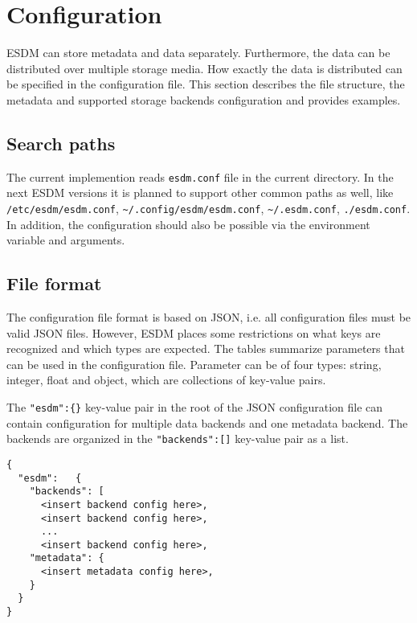 \section{Configuration}

ESDM can store metadata and data separately.
Furthermore, the data can be distributed over multiple storage media.
How exactly the data is distributed can be specified in the configuration file.
This section describes the file structure, the metadata and supported storage backends configuration and provides examples.

\subsection{Search paths}

The current implemention reads \lstinline|esdm.conf| file in the current directory.
In the next ESDM versions it is planned to support other common paths as well, like \lstinline|/etc/esdm/esdm.conf|, \lstinline|~/.config/esdm/esdm.conf|, \lstinline|~/.esdm.conf|, \lstinline|./esdm.conf|.
In addition, the configuration should also be possible via the environment variable and arguments.


\subsection{File format}
The configuration file format is based on JSON, i.e. all configuration files must be valid JSON files.
However, ESDM places some restrictions on what keys are recognized and which types are expected.
The tables summarize parameters that can be used in the configuration file.
Parameter can be of four types: string, integer, float and object, which are collections of key-value pairs.

The \lstinline|"esdm":{}| key-value pair in the root of the JSON configuration file can contain configuration for multiple data backends and one metadata backend.
The backends are organized in the \lstinline|"backends":[]| key-value pair as a list.



\begin{lstlisting}
{
  "esdm":	{
    "backends": [
      <insert backend config here>,
      <insert backend config here>,
      ...
      <insert backend config here>,
    "metadata": {
      <insert metadata config here>,
    }
  }
}
\end{lstlisting}

